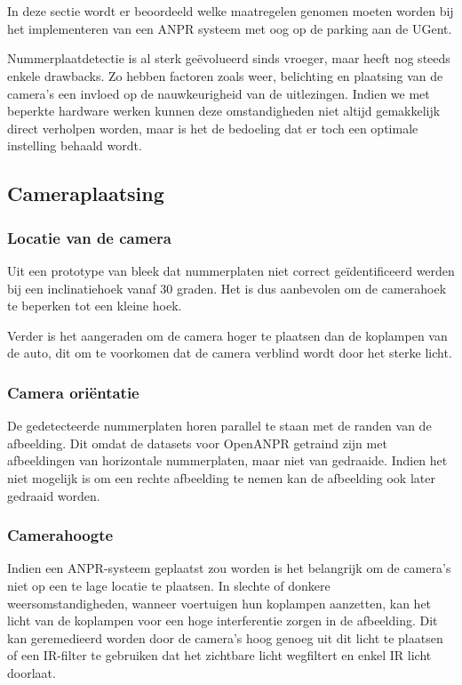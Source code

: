 
\chapter{}
\label{ch:maatregelenanpr}

In deze sectie wordt er beoordeeld welke maatregelen genomen moeten worden bij het implementeren van een ANPR systeem met oog op de parking aan de UGent.

Nummerplaatdetectie is al sterk geëvolueerd sinds vroeger, maar heeft nog steeds enkele drawbacks. Zo hebben factoren zoals weer, belichting en plaatsing van de camera's een invloed op de nauwkeurigheid van de uitlezingen. Indien we met beperkte hardware werken kunnen deze omstandigheden niet altijd gemakkelijk direct verholpen worden, maar is het de bedoeling dat er toch een optimale instelling behaald wordt.

\section{Cameraplaatsing}

\subsection{Locatie van de camera}
Uit een prototype van \textcite{arrieta2019prototype} bleek dat nummerplaten niet correct geïdentificeerd werden bij een inclinatiehoek vanaf 30 graden. Het is dus aanbevolen om de camerahoek te beperken tot een kleine hoek.

Verder is het aangeraden om de camera hoger te plaatsen dan de koplampen van de auto, dit om te voorkomen dat de camera verblind wordt door het sterke licht.

\subsection{Camera oriëntatie}
De gedetecteerde nummerplaten horen parallel te staan met de randen van de afbeelding. Dit omdat de datasets voor OpenANPR getraind zijn met afbeeldingen van horizontale nummerplaten, maar niet van gedraaide. Indien het niet mogelijk is om een rechte afbeelding te nemen kan de afbeelding ook later gedraaid worden.

\subsection{Camerahoogte}
Indien een ANPR-systeem geplaatst zou worden is het belangrijk om de camera's niet op een te lage locatie te plaatsen. In slechte of donkere weersomstandigheden, wanneer voertuigen hun koplampen aanzetten, kan het licht van de koplampen voor een hoge interferentie zorgen in de afbeelding. Dit kan geremedieerd worden door de camera's hoog genoeg uit dit licht te plaatsen of een IR-filter te gebruiken dat het zichtbare licht wegfiltert en enkel IR licht doorlaat.

